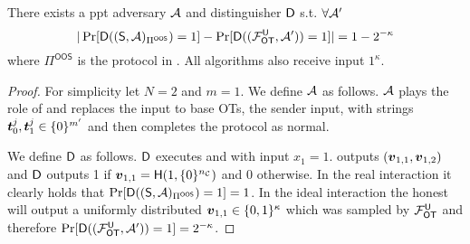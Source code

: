 


\label{proof:Attack_BadT0}
\begin{lemma} \label{lem:malRec}
	There exists a ppt adversary $\Adv$ and distinguisher $\D$ s.t. $\forall\Adv'$ 
	$$
	|\Pr[\D((\send, \Adv)_{\Pi^{\textsf{OOS}}})=1]-\Pr[\D((\OOT^{\U}, \Adv'))=1]|=1-2^{-\kappa}
	$$
	where $\Pi^{\textsf{OOS}}$ is the protocol in . All algorithms also receive input $1^\kappa$. 
\end{lemma}
\begin{proof}
	For simplicity let $N=2$ and $m=1$. We define $\Adv$ as follows. $\Adv$ plays the role of \rec and replaces the input to base OTs, the sender input, with strings $\tt_0^j,\tt_1^j\in \{0\}^{m'}$ and then completes the protocol as normal.
	
	We define $\D$ as follows. $\D$ executes \send and \Adv with input $x_1=1$. \send outputs $(\vv_{1,1},\vv_{1,2})$ and $\D$ outputs 1 if $\vv_{1,1}=\H(1, \{0\}^\nc)$ and 0 otherwise. In the real interaction it clearly holds that $\Pr[\D((\send, \Adv)_{\Pi^{\textsf{OOS}}})=1]=1$. In the ideal interaction the honest \send will output a uniformly distributed $\vv_{1,1}\in\{0,1\}^\kappa$ which was sampled by $\OOT^{\U}$ and therefore $\Pr[\D((\OOT^{\U}, \Adv'))=1]=2^{-\kappa}$.
	\pe
\end{proof}